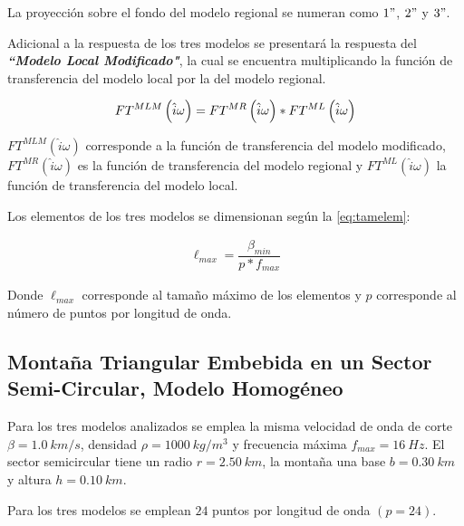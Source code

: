 \documentclass[spanish,letterpaper,12pt,twoside,openany]{article}
\begin{document}
La proyección sobre el fondo del modelo regional se numeran como $1"$, $2"$ y $3"$.

Adicional a la respuesta de los tres modelos se presentará la respuesta del \textbf{\textit{``Modelo Local Modificado"}}, la cual se encuentra multiplicando la función de transferencia del modelo local por la del modelo regional.
%
\begin{large}
	\begin{align}
		FT^{MLM} \left(\hat{i} \omega \right)= FT^{MR} \left(\hat{i} \omega \right) * FT^{ML} \left(\hat{i} \omega \right) 
		\vspace{-1 cm}
	\end{align}
\end{large}
%
$FT^{MLM} \left(\hat{i} \omega \right)$ corresponde a la función de transferencia del modelo modificado, $FT^{MR} \left(\hat{i} \omega \right)$ es la función de transferencia del modelo regional y $FT^{ML} \left(\hat{i} \omega \right)$ la función de transferencia del modelo local.

Los elementos de los tres modelos se dimensionan según la \cref{eq:tamelem}:
%
\begin{large}
	\begin{align}\label{eq:tamelem}
		\ell_{max} = \dfrac{\beta_{min}}{p * f_{max}}
 	\end{align}
\end{large}
%
Donde $\ell_{max}$ corresponde al tamaño máximo de los elementos y $p$ corresponde al número de puntos por longitud de onda.
%
\subsection{Montaña Triangular Embebida en un Sector Semi-Circular, Modelo Homogéneo}
%
Para los tres modelos analizados se emplea la misma velocidad de onda de corte $\beta = 1.0\ km/s$, densidad $\rho = 1000\ kg/m^3$ y frecuencia máxima $f_{max} =  16\ Hz$. El sector semicircular tiene un radio $r=2.50\ km$, la montaña una base $b=0.30\ km$ y altura $h=0.10\ km$.

Para los tres modelos se emplean $24$ puntos por longitud de onda $\left( p = 24 \right)$.
\end{document}
